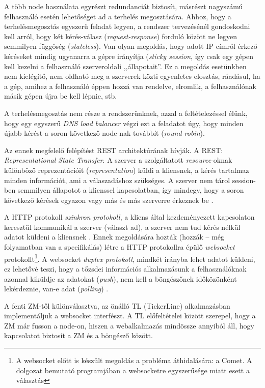 \documentclass[12pt, a4paper, oneside]{book}
\begin{document}
A több node használata egyrészt redundanciát biztosít, másrészt nagyszámú
felhasználó esetén lehetőséget ad a terhelés megosztására. Ahhoz, hogy a
terhelésmegosztás egyszerű feladat legyen, a rendszer tervezésénél gondoskodni
kell arról, hogy két kérés-válasz (\emph{request-response}) forduló között ne
legyen semmilyen függőség (\emph{stateless}). Van olyan megoldás, hogy adott IP
címről érkező kéréseket mindig ugyanarra a gépre irányítja (\emph{sticky
session}, így csak egy gépen kell kezelni a felhasználó szerveroldali
,,állapotait''. Ez a megoldás esetünkben nem kielégítő, nem oldható meg a
szerverek közti egyenletes elosztás, ráadásul, ha a gép, amihez a felhasználó
éppen hozzá van rendelve, elromlik, a felhasználónak másik gépen újra be kell
lépnie, stb.

A terhelésmegosztás nem része a rendszerünknek, azzal a feltételezéssel élünk,
hogy egy egyszerű \emph{DNS load balancer} végzi ezt a feladatot úgy, hogy
minden újabb kérést a soron következő node-nak továbbít (\emph{round robin}). 

Az ennek megfelelő felépítést REST architektúrának hívják. A REST:
\emph{Representational State Transfer}. A szerver a szolgáltatott
\emph{resource}-oknak különböző reprezentációit (\emph{representation})
küldi a kliensnek, a kérés tartalmaz minden információt, ami a válaszadáshoz
szükséges. A szerver nem tárol session-ben semmilyen állapotot a klienssel
kapcsolatban, így mindegy, hogy a soron következő kérések egyazon vagy más és
más szerverre érkeznek be \citep{Fielding}.

A HTTP protokoll \emph{szinkron protokoll}, a kliens által kezdeményezett
kapcsolaton keresztül kommunikál a szerver (választ ad), a szerver nem tud
kérés nélkül adatot küldeni a kliensnek \citep{HTTPSpec}. Ennek megoldására hozták (hozzák --
még folyamatban van a specifikálás) létre a HTTP protokollra épülő
\emph{websocket} protokollt\footnote{A websocket előtt is készült megoldás a
probléma áthidalására: a Comet. A dolgozat bemutató programjában a websocketre
egyszerűsége miatt esett a választás}.  A websocket \emph{duplex protokoll},
mindkét irányba lehet adatot küldeni, ez lehetővé teszi, hogy a tőzsdei
információs alkalmazásunk a felhasználóknak azonnal kiküldje az adatokat
(\emph{push}), nem kell a böngészőnek időközönként lekérdeznie, van-e adat
(\emph{polling}) \citep{WebsocketSpec}.

A fenti ZM-től különválasztva, az önálló TL (TickerLine) alkalmazásban 
implementáljuk a websocket interfészt. A TL előfeltételei között szerepel, hogy
a ZM már fusson a node-on, hiszen a webalkalmazás mindössze annyiból áll, hogy
kapcsolatot biztosít a ZM és a böngésző között.
\end{document}
